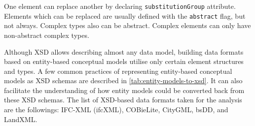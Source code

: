 One element can replace another by declaring \texttt{substitutionGroup} attribute.
Elements which can be replaced are usually defined with the \texttt{abstract} flag, but not always.
Complex types also can be abstract.
Complex elements can only have non-abstract complex types.





\bigskip{}


Although XSD allows describing almost any data model, building data formats based on entity-based conceptual models utilise only certain element structures and types.
A few common practices of representing entity-based conceptual models as XSD schemas are described in \autoref{tab:entity-models-to-xsd}.
It can also facilitate the understanding of how entity models could be converted back from these XSD schemas.
The list of XSD-based data formats taken for the analysis are the followings: IFC-XML (ifcXML), COBieLite, CityGML, bsDD, and LandXML.

